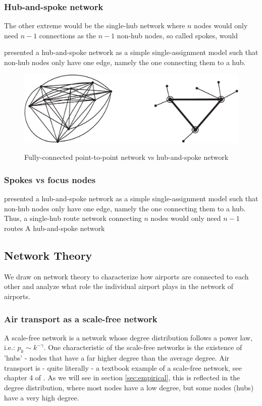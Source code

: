 \subsubsection{Hub-and-spoke network}
The other extreme would be the single-hub network where $n$ nodes would only need $n-1$ connections as the $n-1$ non-hub nodes, so called spokes, would
 \par
\citet{o1987quadratic} presented a hub-and-spoke network as a simple single-assignment model such that non-hub nodes only have one edge, namely the one connecting them to a hub.


\begin{figure}[H]
  \centering
  \caption{Fully-connected point-to-point network vs hub-and-spoke network}
    \includegraphics[width=1. \textwidth]{03_figures/Bryan_1999_networks}
  \label{fig:different_networks}
\end{figure}

\subsubsection{Spokes vs focus nodes}
\citet{o1987quadratic} presented a hub-and-spoke network as a simple single-assignment model such that non-hub nodes only have one edge, namely the one connecting them to a hub. Thus, a single-hub route network connecting $n$ nodes would only need $n-1$ routes
A hub-and-spoke network

\subsection{Network Theory}
\label{subsec:Network Theory}
We draw on network theory to characterize how airports are connected to each other and analyze what role the individual airport plays in the network of airports. %

\subsubsection{Air transport as a scale-free network}
A scale-free network is a network whose degree distribution follows a power law, i.e.: $p_k \sim k^{-\gamma}$. One characteristic of the scale-free networks is the existence of 'hubs' - nodes that have a far higher degree than the average degree. Air transport is - quite literally - a textbook example of a scale-free network, see chapter 4 of \citet{Barabasi}. As we will see in section \ref{sec:empirical}, this is reflected in the degree distribution, where most nodes have a low degree, but some nodes (hubs) have a very high degree.

